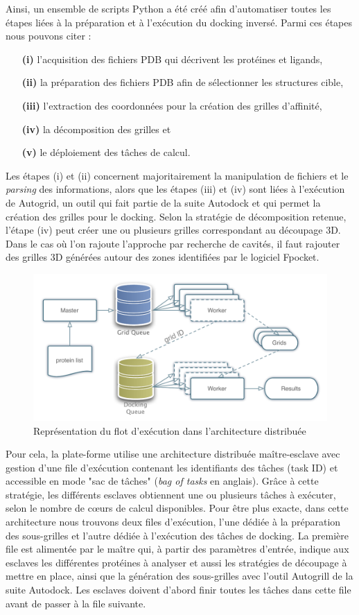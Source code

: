 Ainsi, un ensemble de scripts Python a été créé afin d'automatiser toutes les étapes liées à la préparation et à l'exécution du docking inversé. Parmi ces étapes nous pouvons citer :
\begin{itemize}
	\item[\textbf{(i)}] l'acquisition des fichiers PDB qui décrivent les protéines et ligands, 
	\item[\textbf{(ii)}] la préparation des fichiers PDB afin de sélectionner les structures cible, 
	\item[\textbf{(iii)}] l'extraction des coordonnées pour la création des grilles d'affinité, 
	\item[\textbf{(iv)}] la décomposition des grilles et 
	\item[\textbf{(v)}] le déploiement des tâches de calcul. 
\end{itemize}

Les étapes (i) et (ii) concernent majoritairement la manipulation de fichiers et le \textit{parsing} des informations, alors que les étapes  (iii) et (iv) sont liées à l'exécution de Autogrid, un outil qui fait partie de la suite Autodock et qui permet la création des grilles pour le docking. Selon la stratégie de décomposition retenue, l'étape (iv) peut créer une ou plusieurs grilles correspondant au découpage 3D. Dans le cas où l'on rajoute l'approche par recherche de cavités, il faut rajouter des grilles 3D générées  autour des zones identifiées par le logiciel Fpocket. 


\begin{figure}
	\centering
		\includegraphics[width=0.5\linewidth]{images/Romain/fig3-color}
	\caption{Représentation du flot d'exécution dans l'architecture distribuée}\label{fig:romain-fig3}
\end{figure}


Pour cela, la plate-forme utilise une architecture distribuée maître-esclave avec gestion d'une file d'exécution contenant les identifiants des tâches (task ID) et accessible en mode "sac de tâches" (\textit{bag of tasks} en anglais). Grâce à cette stratégie, les différents esclaves obtiennent une ou plusieurs tâches à exécuter, selon le nombre de c{\oe}urs de calcul disponibles. Pour être plus exacte, dans cette architecture nous trouvons deux files d'exécution, l'une dédiée à la préparation des sous-grilles et l'autre dédiée à l'exécution des tâches de docking. La première file est alimentée par le maître qui, à partir des paramètres d'entrée, indique aux esclaves les différentes protéines à analyser et aussi les stratégies de découpage à mettre en place, ainsi que la génération des sous-grilles avec l'outil Autogrill de la suite Autodock. Les esclaves doivent d'abord finir toutes les tâches dans cette file avant de passer à la file suivante.

